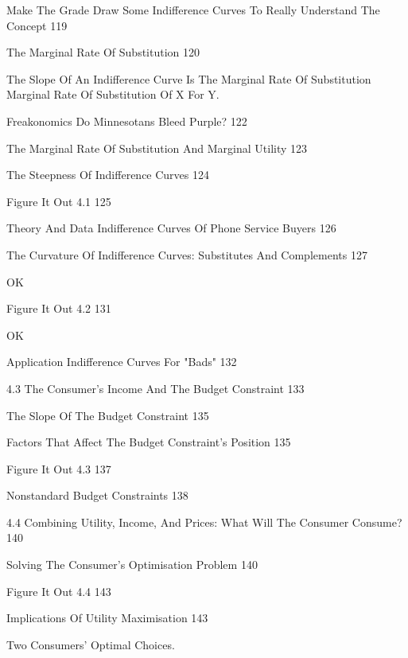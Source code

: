 Make The Grade Draw Some Indifference Curves To Really Understand The Concept 119



The Marginal Rate Of Substitution 120

The Slope Of An Indifference Curve Is The Marginal Rate Of Substitution
Marginal Rate Of Substitution Of X For Y.

Freakonomics Do Minnesotans Bleed Purple? 122



The Marginal Rate Of Substitution And Marginal Utility 123



The Steepness Of Indifference Curves 124



Figure It Out 4.1 125



Theory And Data Indifference Curves Of Phone Service Buyers 126



The Curvature Of Indifference Curves: Substitutes And Complements 127

OK

Figure It Out 4.2 131

OK

Application Indifference Curves For "Bads" 132



4.3 The Consumer's Income And The Budget Constraint 133



The Slope Of The Budget Constraint 135



Factors That Affect The Budget Constraint's Position 135



Figure It Out 4.3 137



Nonstandard Budget Constraints 138



4.4 Combining Utility, Income, And Prices: What Will The Consumer Consume? 140



Solving The Consumer's Optimisation Problem 140



Figure It Out 4.4 143



Implications Of Utility Maximisation 143

Two Consumers' Optimal Choices.

